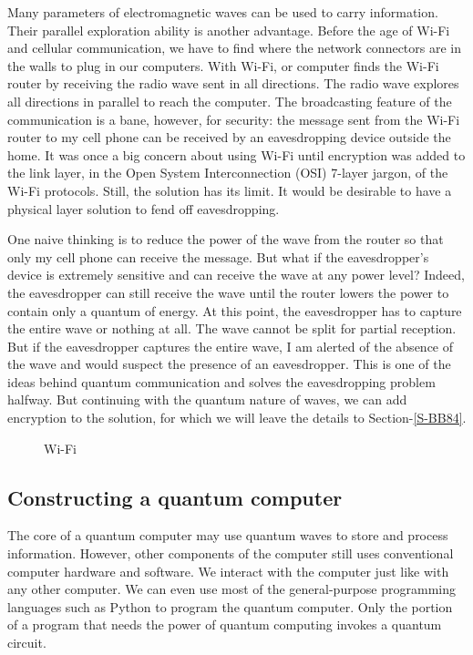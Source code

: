 \documentclass[oneside, letter, 12pt]{book}
\begin{document}
Many parameters of electromagnetic waves can be used to carry information. Their parallel exploration ability is another advantage. Before the age of Wi-Fi and cellular communication, we have to find where the network connectors are in the walls to plug in our computers. With Wi-Fi, or computer finds the Wi-Fi router by receiving the radio wave sent in all directions. The radio wave explores all directions in parallel to reach the computer. The broadcasting feature of the communication is a bane, however, for security: the message sent from the Wi-Fi router to my cell phone can be received by an eavesdropping device outside the home. It was once a big concern about using Wi-Fi until encryption was added to the link layer, in the Open System Interconnection (OSI) 7-layer jargon, of the Wi-Fi protocols. Still, the solution has its limit. It would be desirable to have a physical layer solution to fend off eavesdropping.

One naive thinking is to reduce the power of the wave from the router so that only my cell phone can receive the message. But what if the eavesdropper's device is extremely sensitive and can receive the wave at any power level? Indeed, the eavesdropper can still receive the wave until the router lowers the power to contain only a quantum of energy. At this point, the eavesdropper has to capture the entire wave or nothing at all. The wave cannot be split for partial reception. But if the eavesdropper captures the entire wave, I am alerted of the absence of the wave and would suspect the presence of an eavesdropper. This is one of the ideas behind quantum communication and solves the eavesdropping problem halfway. But continuing with the quantum nature of waves, we can add encryption to the solution, for which we will leave the details to Section-\ref{S-BB84}.

\begin{figure}[h]\label{Room-WiFi}
\caption{Wi-Fi}
\end{figure}

\subsection{Constructing a quantum computer}
The core of a quantum computer may use quantum waves to store and process information. However, other components of the computer still uses conventional computer hardware and software. We interact with the computer just like with any other computer. We can even use most of the general-purpose programming languages such as Python to program the quantum computer. Only the portion of a program that needs the power of quantum computing invokes a quantum circuit.
\end{document}
